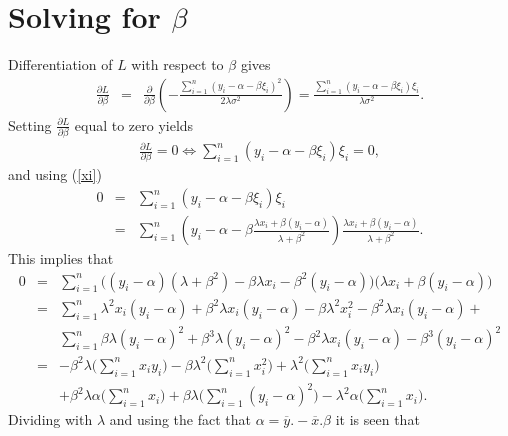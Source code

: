 \documentclass[a4paper,twoside,12pt]{article}
\begin{document}
\section{Solving for $\beta$}
Differentiation of $L$ with respect to $\beta$ gives
\begin{eqnarray*}
\frac{\partial L}{\partial\beta}
&=&
\frac{\partial}{\partial\beta}\left(
-\frac{\sum_{i=1}^n(y_i-\alpha-\beta\xi_i)^2}{2\lambda\sigma^2}\right)
=
\frac{\sum_{i=1}^n (y_i-\alpha-\beta\xi_i)\xi_i}{\lambda\sigma^2}.
\end{eqnarray*}
Setting $\frac{\partial L}{\partial \beta}$ equal to zero yields
\begin{eqnarray*}
\frac{\partial L}{\partial \beta}=0
\Leftrightarrow
\sum_{i=1}^n(y_i-\alpha-\beta\xi_i)\xi_i=0,
\end{eqnarray*}
and using (\ref{xi})
\begin{eqnarray*}
0
&=&
\sum_{i=1}^n(y_i-\alpha-\beta\xi_i)\xi_i\\[1em]
&=&
\sum_{i=1}^n\left(y_i-\alpha-\beta\frac{\lambda
  x_i+\beta(y_i-\alpha)}{\lambda+\beta^2}\right)\frac{\lambda
  x_i+\beta(y_i-\alpha)}{\lambda+\beta^2}.
\end{eqnarray*}
This implies that
\begin{eqnarray*}
0
&=&
\sum_{i=1}^n\Big(( y_i-\alpha)(\lambda+\beta^2)-\beta\lambda
  x_i-\beta^2(y_i-\alpha)\Big)\Big(\lambda
  x_i+\beta(y_i-\alpha)\Big)\\[1em]
&=&
\sum_{i=1}^n
\lambda^2x_i(y_i-\alpha)
+\beta^2\lambda x_i(y_i-\alpha)
-\beta\lambda^2 x_i^2
-\beta^2\lambda x_i(y_i-\alpha)+\\[1em]
&&
\sum_{i=1}^n\beta\lambda(y_i-\alpha)^2
+\beta^3\lambda(y_i-\alpha)^2
-\beta^2\lambda x_i(y_i-\alpha)
-\beta^3(y_i-\alpha)^2\\[1em]
&=&
-\beta^2\lambda\Big(\sum_{i=1}^nx_iy_i\Big)
-\beta\lambda^2\Big(\sum_{i=1}^n x_i^2\Big)
+\lambda^2\Big(\sum_{i=1}^n x_iy_i\Big)\\[1em]
&&
+\beta^2\lambda\alpha\Big(\sum_{i=1}^nx_i\Big)
+\beta\lambda\Big(\sum_{i=1}^n(y_i-\alpha)^2\Big)
-\lambda^2\alpha\Big(\sum_{i=1}^nx_i\Big).
\end{eqnarray*}
Dividing with $\lambda$ and using the fact that
$\alpha=\overline{y}.-\overline{x}.\beta$ it is seen that
\end{document}
